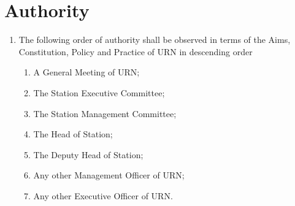 \section{Authority}

\begin{enumerate}[label*=\thesection.\arabic*.]
    \item The following order of authority shall be observed in terms of the Aims, Constitution, Policy and Practice of URN in descending order
          \begin{enumerate}[label*=\arabic*.]
              \item A General Meeting of URN;
              \item The Station Executive Committee;
              \item The Station Management Committee;
              \item The Head of Station;
              \item The Deputy Head of Station;
              \item Any other Management Officer of URN;
              \item Any other Executive Officer of URN.
          \end{enumerate}
\end{enumerate}
